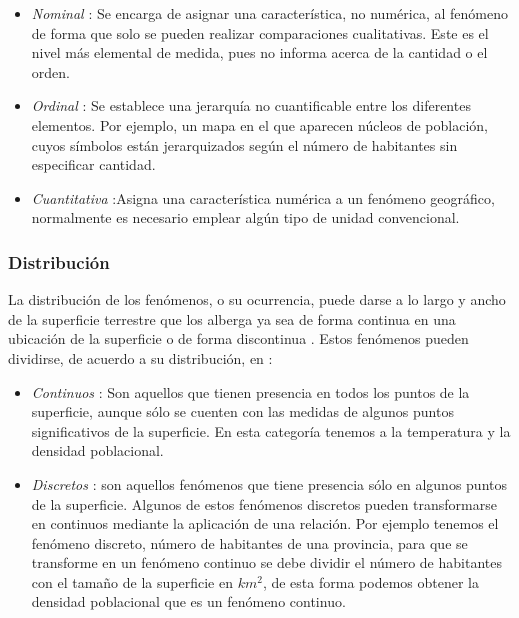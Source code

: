 \begin{itemize}
    \item \textit{Nominal} : Se encarga de asignar una característica, no numérica, al fenómeno de forma que solo se pueden realizar comparaciones cualitativas. Este es el nivel más elemental de medida, pues no informa acerca de la cantidad o el orden.

    \item \textit{Ordinal} : Se establece una jerarquía no cuantificable entre los diferentes elementos. Por ejemplo, un mapa en el que aparecen núcleos de población, cuyos símbolos están jerarquizados según el número de habitantes sin especificar cantidad.

    \item \textit{Cuantitativa} :Asigna una característica numérica a un fenómeno geográfico, normalmente es necesario emplear algún tipo de unidad convencional.
\end{itemize}

\subsubsection{Distribución}
La distribución de los fenómenos, o su ocurrencia, puede darse a lo largo y ancho de la superficie
terrestre que los alberga ya sea de forma continua en una ubicación de la superficie o de forma
discontinua \citep{fomentoConceptos2010}. Estos fenómenos pueden dividirse, de acuerdo a su distribución, en :

\begin{itemize}
    \item \textit{Continuos} : Son aquellos que tienen presencia en todos los puntos de la superficie, aunque sólo se cuenten con las medidas de algunos puntos significativos de la superficie. En esta categoría tenemos a la temperatura y la densidad poblacional.

    \item \textit{Discretos} : son aquellos fenómenos que tiene presencia sólo en algunos puntos de la superficie. Algunos de estos fenómenos discretos pueden transformarse en continuos mediante la aplicación de una relación. Por ejemplo tenemos el fenómeno discreto, número de habitantes de una provincia, para que se transforme en un fenómeno continuo se debe dividir el número de habitantes con el tamaño de la superficie en $km^2$, de esta forma podemos obtener la densidad poblacional que es un fenómeno continuo.
\end{itemize}
